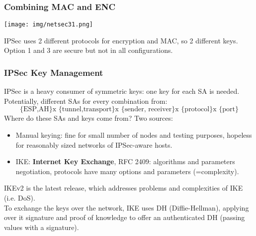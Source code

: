 \documentclass[a4paper, 10pt, titlepage]{article}
\begin{document}
\subsubsection*{Combining MAC and ENC}
\begin{center}
	\texttt{[image: img/netsec31.png]}
\end{center}
IPSec uses 2 different protocols for encryption and MAC, so 2 different keys. Option 1 and 3 are secure but not in all configurations.

\subsubsection*{IPSec Key Management}
IPSec is a heavy consumer of symmetric keys: one key for each SA is needed. Potentially, different SAs for every combination from:
$$\text{\{ESP,AH\} x \{tunnel,transport\} x \{sender, receiver\} x \{protocol\} x \{port\}}$$
Where do these SAs and keys come from? Two sources:
\begin{itemize}
	\item Manual keying: fine for small number of nodes and testing purposes, hopeless for reasonably sized networks of IPSec-aware hosts.
	\item IKE: \textbf{Internet Key Exchange}, RFC 2409: algorithms and parameters negotiation, protocols have many options and parameters (=complexity).
\end{itemize}
IKEv2 is the latest release, which addresses problems and complexities of IKE (i.e. DoS). \\
To exchange the keys over the network, IKE uses DH (Diffie-Hellman), applying over it signature and proof of knowledge to offer an authenticated DH (passing values with a signature).
\end{document}
